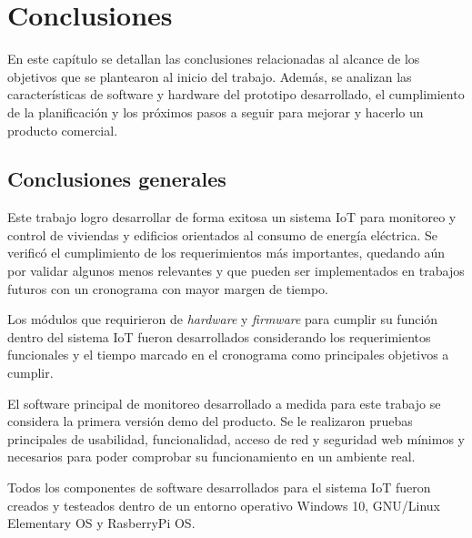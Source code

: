 
\chapter{Conclusiones} %

\label{Chapter5} %

En este capítulo se detallan las conclusiones relacionadas al alcance de los objetivos que se plantearon al inicio del trabajo. Además, se analizan las características de software y hardware del prototipo desarrollado, el cumplimiento de la planificación y los próximos pasos a seguir para mejorar y hacerlo un producto
comercial.



\section{Conclusiones generales }

Este trabajo logro desarrollar de forma exitosa un sistema IoT para monitoreo y control de viviendas y edificios orientados al consumo de energía eléctrica. Se verificó el cumplimiento de los requerimientos más importantes, quedando aún por validar algunos menos relevantes y que pueden ser implementados en trabajos futuros con un cronograma con mayor margen de tiempo.

Los módulos que requirieron de \emph{hardware} y \emph{firmware} para cumplir su función dentro del sistema IoT fueron desarrollados considerando los requerimientos funcionales y el tiempo marcado en el cronograma como principales objetivos a cumplir. 

El software principal de monitoreo desarrollado a medida para este trabajo se considera la primera versión demo del producto. Se le realizaron pruebas principales de usabilidad, funcionalidad, acceso de red y seguridad web mínimos y necesarios para poder comprobar su funcionamiento en un ambiente real. 

Todos los componentes de software desarrollados para el sistema IoT fueron creados y testeados dentro de un entorno operativo Windows 10, GNU/Linux Elementary OS y RasberryPi OS. 


